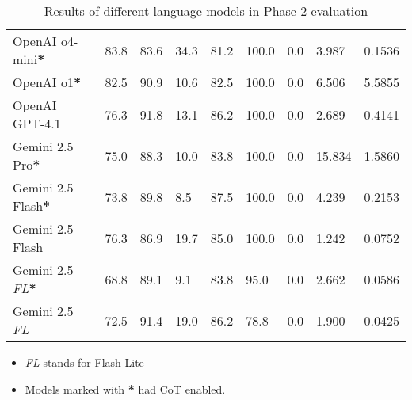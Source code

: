 \begin{table}[h]
\begin{tabularx}{\textwidth}{Xp{1.1cm}p{1.25cm}p{1.6cm}p{1.3cm}p{1.3cm}p{1.3cm}p{1.3cm}p{1.3cm}}
        \rowcolor[gray]{0.9}
        OpenAI o4-mini\textbf{*}         & 83.8                        & 83.6                            & 34.3                   & 81.2                   & 100.0                    & 0.0               & 3.987                         & 0.1536                           \\
        OpenAI o1\textbf{*}              & 82.5                        & 90.9                            & 10.6                   & 82.5                   & 100.0                    & 0.0               & 6.506                         & 5.5855                           \\
        \rowcolor[gray]{0.9}
        OpenAI GPT-4.1                   & 76.3                        & 91.8                            & 13.1                   & 86.2                   & 100.0                    & 0.0               & 2.689                         & 0.4141                           \\
        Gemini 2.5 Pro\textbf{*}         & 75.0                        & 88.3                            & 10.0                   & 83.8                   & 100.0                    & 0.0               & 15.834                        & 1.5860                           \\
        \rowcolor[gray]{0.9}
        Gemini 2.5 Flash\textbf{*}       & 73.8                        & 89.8                            & 8.5                    & 87.5                   & 100.0                    & 0.0               & 4.239                         & 0.2153                           \\
        Gemini 2.5 Flash                 & 76.3                        & 86.9                            & 19.7                   & 85.0                   & 100.0                    & 0.0               & 1.242                         & 0.0752                           \\
        \rowcolor[gray]{0.9}
        Gemini 2.5 \textit{FL}\textbf{*} & 68.8                        & 89.1                            & 9.1                    & 83.8                   & 95.0                     & 0.0               & 2.662                         & 0.0586                           \\
        Gemini 2.5 \textit{FL}           & 72.5                        & 91.4                            & 19.0                   & 86.2                   & 78.8                     & 0.0               & 1.900                         & 0.0425                           \\
        \bottomrule
    \end{tabularx}

    \begin{itemize}
        \footnotesize
        \item \textit{FL} stands for Flash Lite
        \item Models marked with \textbf{*} had CoT enabled.
    \end{itemize}
    \caption{Results of different language models in Phase 2 evaluation}
    \label{tab:phase2_results}
\end{table}
